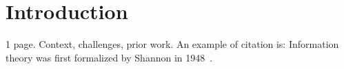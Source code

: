 \section{Introduction}
1 page. Context, challenges, prior work.
An example of citation is: Information theory was first 
formalized by Shannon in 1948~\cite{shannon1948}.